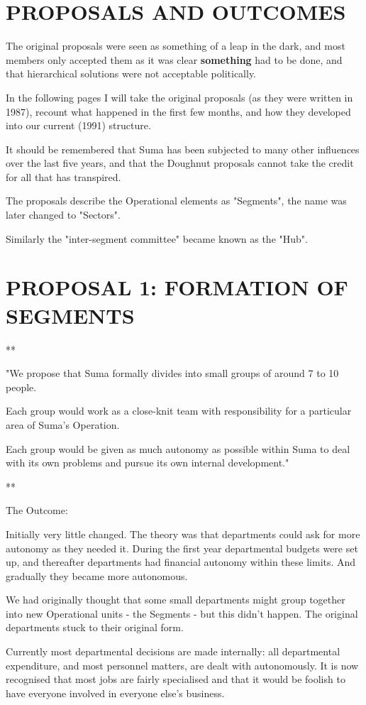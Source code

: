 \section*{PROPOSALS AND OUTCOMES}
The original proposals were seen as something of a leap in the dark, and most members only accepted them as it was clear \textbf{something} had to be done, and that hierarchical solutions were not acceptable politically.

In the following pages I will take the original proposals (as they were written in 1987), recount what happened in the first few months, and how they developed into our current (1991) structure.

It should be remembered that Suma has been subjected to many other influences over the last five years, and that the Doughnut proposals cannot take the credit for all that has transpired.

The proposals describe the Operational elements as "Segments", the name was later changed to "Sectors".

Similarly the "inter-segment committee" became known as the "Hub".

\section*{PROPOSAL 1: FORMATION OF SEGMENTS}
**

"We propose that Suma formally divides into small groups of around 7 to 10 people.

Each group would work as a close-knit team with responsibility for a particular area of Suma's Operation.

Each group would be given as much autonomy as possible within Suma to deal with its own problems and pursue its own internal development."

**

The Outcome:

Initially very little changed. The theory was that departments could ask for more autonomy as they needed it. During the first year departmental budgets were set up, and thereafter departments had financial autonomy within these limits. And gradually they became more autonomous.

We had originally thought that some small departments might group together into new Operational units - the Segments - but this didn't happen. The original departments stuck to their original form.

Currently most departmental decisions are made internally: all departmental expenditure, and most personnel matters, are dealt with autonomously. It is now recognised that most jobs are fairly specialised and that it would be foolish to have everyone involved in everyone else's business.

